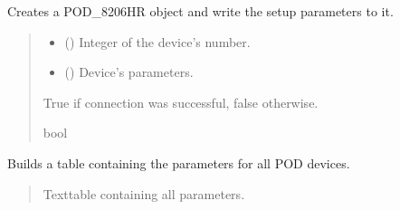 \documentclass[letterpaper,10pt,english]{sphinxmanual}
\begin{document}
\begin{fulllineitems}
\begin{fulllineitems}
\label{\detokenize{Setup.SetupOneDevice:Setup.SetupOneDevice.Setup_8206HR.Setup8206HR._ConnectPODdevice}}
\pysigstartsignatures
{}
\pysigstopsignatures
\sphinxAtStartPar
Creates a POD\_8206HR object and write the setup parameters to it.
\begin{quote}\begin{description}
\begin{itemize}
\item {} 
\sphinxAtStartPar
{} () \textendash{} Integer of the device’s number.

\item {} 
\sphinxAtStartPar
{} () \textendash{} Device’s parameters.

\end{itemize}

\sphinxAtStartPar
True if connection was successful, false otherwise.

\sphinxAtStartPar
bool

\end{description}\end{quote}

\end{fulllineitems}


\begin{fulllineitems}
\label{\detokenize{Setup.SetupOneDevice:Setup.SetupOneDevice.Setup_8206HR.Setup8206HR._GetPODdeviceParameterTable}}
\pysigstartsignatures
{}
\pysigstopsignatures
\sphinxAtStartPar
Builds a table containing the parameters for all POD devices.
\begin{quote}\begin{description}
\sphinxAtStartPar
Texttable containing all parameters.


\end{description}
\end{quote}
\end{fulllineitems}
\end{fulllineitems}
\end{document}
